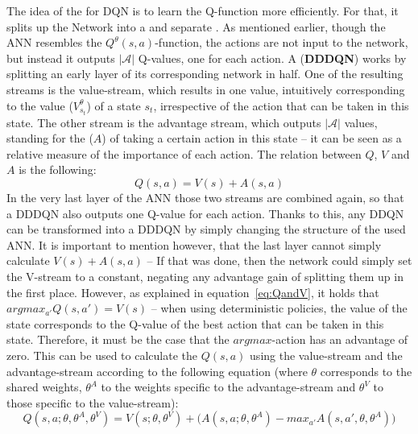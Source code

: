 The idea of the \cite{wang_dueling_2015} for DQN is to learn the Q-function more efficiently. For that, it splits up the Network into a  and separate . As mentioned earlier, though the ANN resembles the $Q^\theta(s,a)$-function, the actions are not input to the network, but instead it outputs $|\mathcal{A}|$ Q-values, one for each action. A  (\textbf{DDDQN}) works by splitting an early layer of its corresponding network in half. One of the resulting streams is the value-stream, which results in one value, intuitively corresponding to the value ($V^\theta_{s_t}$) of a state $s_t$, irrespective of the action that can be taken in this state. The other stream is  the advantage stream, which outputs $|\mathcal{A}|$ values, standing for the  ($A$) of taking a certain action in this state -- it can be seen as a relative measure of the importance of each action. The relation between $Q$, $V$ and $A$ is the following:
\begin{equation*}
	Q(s,a) = V(s) + A(s,a)
\end{equation*}
In the very last layer of the ANN those two streams are combined again, so that a DDDQN also outputs one Q-value for each action. Thanks to this, any DDQN can be transformed into a DDDQN by simply changing the structure of the used ANN. It is important to mention however, that the last layer cannot simply calculate $V(s) + A(s,a)$ -- If that was done, then the network could simply set the V-stream to a constant, negating any advantage gain of splitting them up in the first place. However, as explained in equation~\ref{eq:QandV}, it holds that $argmax_{a'}Q(s,a') = V(s)$ -- when using deterministic policies, the value of the state corresponds to the Q-value of the best action that can be taken in this state. Therefore, it must be the case that the $argmax$-action has an advantage of zero. This can be used to calculate the $Q(s,a)$ using the value-stream and the advantage-stream according to the following equation (where $\theta$ corresponds to the shared weights, $\theta^A$ to the weights specific to the advantage-stream and $\theta^V$ to those specific to the value-stream):
\begin{equation*}
	Q(s,a; \theta, \theta^A, \theta^V) = V(s; \theta, \theta^V) + \big( A(s,a; \theta, \theta^A) - max_{a'}A(s,a',\theta, \theta^A) \big)
\end{equation*}
